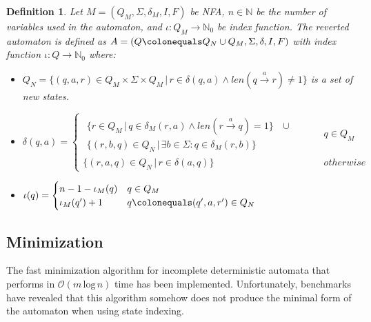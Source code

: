 \documentclass[pdflatex,sn-mathphys-num]{sn-jnl}%
\theoremstyle{thmstyleone}%
\theoremstyle{thmstyletwo}%
\theoremstyle{thmstylethree}%
\newtheorem{definition}{Definition}%
\begin{document}
        \begin{definition}
            Let $M = (Q_M, \Sigma, \delta_M, I, F)$ be NFA, $n \in \mathbb{N}$ be the number of variables used in the automaton, and $\iota : Q_M \rightarrow \mathbb{N}_0$ be index function. The reverted automaton is defined as $A = (Q \colonequals Q_N \cup Q_M, \Sigma, \delta, I, F)$ with index function $\iota : Q \rightarrow \mathbb{N}_0$ where:
            \begin{itemize}
                \item $Q_N = \{(q, a, r) \in Q_M \times \Sigma \times Q_M\,|\,r \in \delta(q, a) \land len(q \xrightarrow[]{a}r) \neq 1\}$ is a set of new states.
                \vspace*{0.5em}
                \item $\delta(q, a) =
                \begin{cases}
                    \begin{aligned}
                        \{r \in Q_M\,|\,q \in \delta_M(r, a) \land len(r \xrightarrow[]{a} q) = 1\}&\, \cup\\
                        \{(r, b, q) \in Q_N\,|\,\exists b \in \Sigma : q \in \delta_M(r, b)\}&
                    \end{aligned} \hspace{1cm} &q \in Q_M\\[1em]
                    \{(r, a, q) \in Q_N\,|\, r \in \delta(a, q)\}  & otherwise
                \end{cases}
                $
                \vspace*{0.5em}
                \item $\iota(q) =
                \begin{cases}
                    n - 1 - \iota_M(q) & q \in Q_M\\
                    \iota_M(q') + 1 & q \colonequals (q', a, r') \in Q_N

                \end{cases}
                $
            \end{itemize}
        \end{definition}

    \subsection{Minimization}
        The fast minimization algorithm for incomplete deterministic automata \cite{Minimization} that performs in $\mathcal{O}(m\, \text{log}\, n)$ time has been implemented. Unfortunately, benchmarks have revealed that this algorithm somehow does not produce the minimal form of the automaton when using state indexing.
\end{document}
